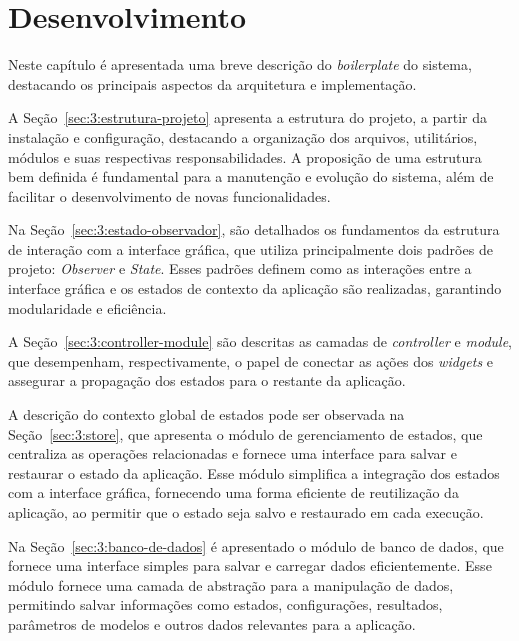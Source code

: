 
\chapter{Desenvolvimento}
\label{cap:3:desenvolvimento}

Neste capítulo é apresentada uma breve descrição do \textit{boilerplate} do sistema, destacando os principais aspectos da arquitetura e implementação.

A Seção~\ref{sec:3:estrutura-projeto} apresenta a estrutura do projeto, a partir da instalação e configuração, destacando a organização dos arquivos, utilitários, módulos e suas respectivas responsabilidades. A proposição de uma estrutura bem definida é fundamental para a manutenção e evolução do sistema, além de facilitar o desenvolvimento de novas funcionalidades.

Na Seção~\ref{sec:3:estado-observador}, são detalhados os fundamentos da estrutura de interação com a interface gráfica, que utiliza principalmente dois padrões de projeto: \textit{Observer} e \textit{State}. Esses padrões definem como as interações entre a interface gráfica e os estados de contexto da aplicação são realizadas, garantindo modularidade e eficiência.

A Seção~\ref{sec:3:controller-module} são descritas as camadas de \textit{controller} e \textit{module}, que desempenham, respectivamente, o papel de conectar as ações dos \textit{widgets} e assegurar a propagação dos estados para o restante da aplicação.

A descrição do contexto global de estados pode ser observada na Seção~\ref{sec:3:store}, que apresenta o módulo de gerenciamento de estados, que centraliza as operações relacionadas e fornece uma interface para salvar e restaurar o estado da aplicação. Esse módulo simplifica a integração dos estados com a interface gráfica, fornecendo uma forma eficiente de reutilização da aplicação, ao permitir que o estado seja salvo e restaurado em cada execução.

Na Seção~\ref{sec:3:banco-de-dados} é apresentado o módulo de banco de dados, que fornece uma interface simples para salvar e carregar dados eficientemente. Esse módulo fornece uma camada de abstração para a manipulação de dados, permitindo salvar informações como estados, configurações, resultados, parâmetros de modelos e outros dados relevantes para a aplicação.

